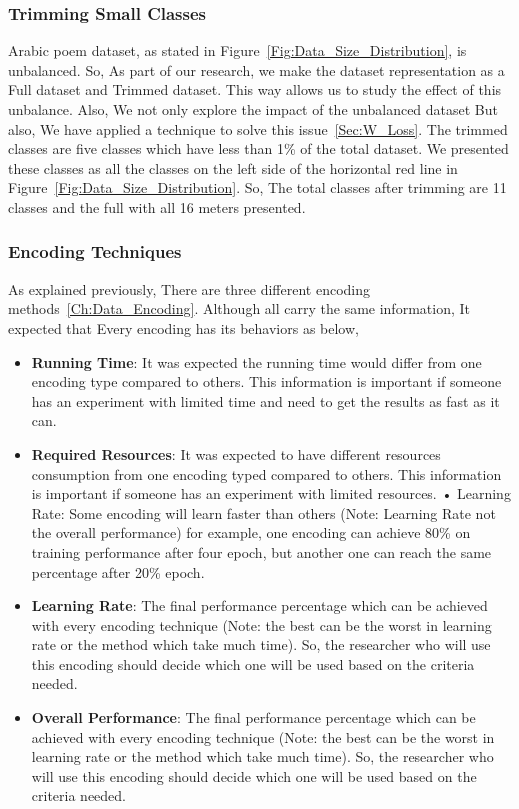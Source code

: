 \subsubsection{Trimming Small Classes}

Arabic poem dataset, as stated in Figure~\ref{Fig:Data_Size_Distribution}, is unbalanced. So, As part of our research, we make the dataset representation as a Full dataset and Trimmed dataset. This way allows us to study the effect of this unbalance. Also, We not only explore the impact of the unbalanced dataset But also, We have applied a technique to solve this issue~\ref{Sec:W_Loss}. The trimmed classes are five classes which have less than 1\% of the total dataset. We presented these classes as all the classes on the left side of the horizontal red line in Figure~\ref{Fig:Data_Size_Distribution}. So, The total classes after trimming are 11 classes and the full with all 16 meters presented.

\subsubsection{Encoding Techniques}

As explained previously, There are three different encoding methods~\ref{Ch:Data_Encoding}. Although all carry the same information, It expected that Every encoding has its behaviors as below,
\begin{itemize}
 \item \textbf{Running Time}: It was expected the running time would differ from one encoding type compared to others. This information is important if someone has an experiment with limited time and need to get the results as fast as it can.
 \item \textbf{Required Resources}: It was expected to have different resources consumption from one encoding typed compared to others. This information is important if someone has an experiment with limited resources.
 • Learning Rate: Some encoding will learn faster than others (Note: Learning Rate not the overall performance) for example, one encoding can achieve 80\% on training performance after four epoch, but another one can reach the same percentage after 20\% epoch.
 \item \textbf{Learning Rate}: The final performance percentage which can be achieved with every encoding technique (Note: the best can be the worst in learning rate or the method which take much time). So, the researcher who will use this encoding should decide which one will be used based on the criteria needed.

 \item \textbf{Overall Performance}: The final performance percentage which can be achieved with every encoding technique (Note: the best can be the worst in learning rate or the method which take much time). So, the researcher who will use this encoding should decide which one will be used based on the criteria needed.

\end{itemize}

